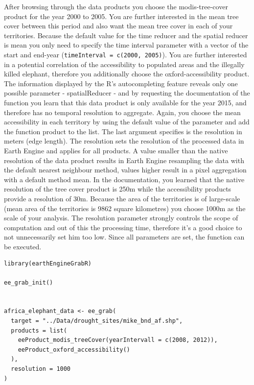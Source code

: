 \documentclass[12pt,twoside,a4paper,final]{report}
\begin{document}
After browsing through the data products you choose the modis-tree-cover product for the year 2000 to 2005. You are further interested in the mean tree cover between this period and also want the mean tree cover in each of your territories. Because the default value for the time reducer and the spatial reducer is mean you only need to specify the time interval parameter with a vector of the start and end-year (\texttt{timeInterval = c(2000, 2005)}). You are further interested in a potential correlation of the accessibility to populated areas and the illegally killed elephant, therefore you additionally choose the oxford-accessibility product. The information displayed by the R's autocompleting feature reveals only one possible parameter - spatialReducer - and by requesting the documentation of the function you learn that this data product is only available for the year 2015, and therefore has no temporal resolution to aggregate. Again, you choose the mean accessibility in each territory by using the default value of the parameter and add the function product to the list. The last argument specifies is the resolution in meters (edge length). The resolution sets the resolution of the processed data in Earth Engine and applies for all products. A value smaller than the native resolution of the data product results in Earth Engine resampling the data with the default nearest neighbour method, values higher result in a pixel aggregation with a default method mean. In the documentation, you learned that the native resolution of the tree cover product is 250m while the accessibility products provide a resolution of 30m. Because the area of the territories is of large-scale (mean area of the territories is 9862 square kilometres) you choose 1000m as the scale of your analysis. The resolution parameter strongly controls the scope of computation and out of this the processing time, therefore it's a good choice to not unnecessarily set him too low. 
Since all parameters are set, the function can be executed. 

\begin{lstlisting}
library(earthEngineGrabR)

ee_grab_init()


africa_elephant_data <- ee_grab(
  target = "../Data/drought_sites/mike_bnd_af.shp",
  products = list(
    eeProduct_modis_treeCover(yearIntervall = c(2008, 2012)),
    eeProduct_oxford_accessibility()
  ),
  resolution = 1000
)
\end{lstlisting}
\end{document}
